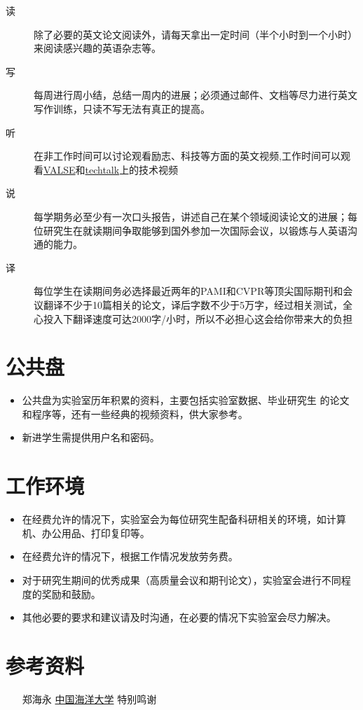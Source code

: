 \documentclass[a4paper，12pt]{article}
\begin{document}
\begin{description}

\item[读] 除了必要的英文论文阅读外，请每天拿出一定时间（半个小时到一个小时）来阅读感兴趣的英语杂志等。

\item[写] 每周进行周小结，总结一周内的进展；必须通过邮件、文档等尽力进行英文写作训练，只读不写无法有真正的提高。

\item[听] 在非工作时间可以讨论观看励志、科技等方面的英文视频,工作时间可以观看\href{http://vision.ouc.edu.cn/valse/}{VALSE}和\href{http://techtalks.tv/}{techtalk}上的技术视频

\item[说] 每学期务必至少有一次口头报告，讲述自己在某个领域阅读论文的进展；每位研究生在就读期间争取能够到国外参加一次国际会议，以锻炼与人英语沟通的能力。

\item[译] 每位学生在读期间务必选择最近两年的PAMI和CVPR等顶尖国际期刊和会议翻译不少于10篇相关的论文，译后字数不少于5万字，经过相关测试，全心投入下翻译速度可达2000字/小时，所以不必担心这会给你带来大的负担

\end{description}

\section{公共盘}

\begin{itemize}

\item 公共盘为实验室历年积累的资料，主要包括实验室数据、毕业研究生
的论文和程序等，还有一些经典的视频资料，供大家参考。

\item 新进学生需提供用户名和密码。

\end{itemize}

\section{工作环境}

\begin{itemize}

\item 在经费允许的情况下，实验室会为每位研究生配备科研相关的环境，如计算机、办公用品、打印复印等。

\item 在经费允许的情况下，根据工作情况发放劳务费。

\item 对于研究生期间的优秀成果（高质量会议和期刊论文），实验室会进行不同程度的奖励和鼓励。

\item 其他必要的要求和建议请及时沟通，在必要的情况下实验室会尽力解决。

\end{itemize}

\section{参考资料}

\begin{itemize}
\item[郑海永]\href{http://vision.ouc.edu.cn/~zhenghaiyong/}{中国海洋大学} 特别鸣谢
\end{itemize}
\end{document}
